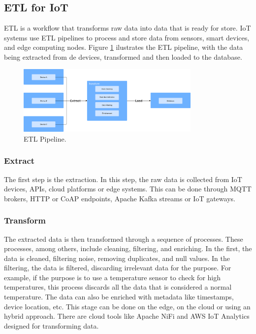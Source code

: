 \subsection{ETL for IoT}
\gls{ETL} is a workflow that transforms raw data into data that is ready for
store. IoT systems use \gls{ETL} pipelines to process and store data from sensors,
smart devices, and edge computing nodes. Figure \ref{fig:etl:pipeline}
ilustrates the \gls{ETL} pipeline, with the data being extracted from de devices,
transformed and then loaded to the database.

\begin{figure}[htbp]
	\centering
	\includegraphics[width=0.8\textwidth, height=0.5\textheight, keepaspectratio]{Chapters/Figures/ETL/ETL.pdf}
	\caption{ETL Pipeline.}
	\label{fig:etl:pipeline}
\end{figure}

\subsubsection{Extract}
The first step is the extraction. In this step, the raw data is collected from
IoT devices, APIs, cloud platforms or edge systems. This can be done through
MQTT brokers, HTTP or CoAP endpoints, Apache Kafka streams or IoT gateways.

\subsubsection{Transform}
The extracted data is then transformed through a sequence of processes. These
processes, among others, include cleaning, filtering, and enriching.
In the first, the data is cleaned, filtering noise, removing duplicates, and
null values. In the filtering, the data is filtered, discarding irrelevant data
for the purpose. For example, if the purpose is to use a temperature sensor to
check for high temperatures, this process discards all the data that is
considered a normal temperature. The data can also be enriched with metadata
like timestamps, device location, etc. This stage can be done on the edge, on
the cloud or using an hybrid approach. There are cloud tools like Apache NiFi
and AWS IoT Analytics designed for transforming data.

